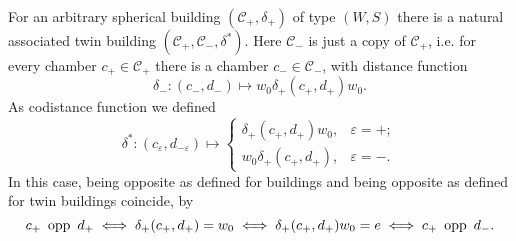 \begin{exam}
	For an arbitrary spherical building $(\mathcal{C}_+, \delta_+)$ of type $(W,S)$ there is a natural associated twin building $(\mathcal{C}_+, \mathcal{C}_-, \delta^*)$. Here $\mathcal{C}_-$ is just a copy of $\mathcal{C}_+$, i.e. for every chamber $c_+ \in \mathcal{C}_+$ there is a chamber $c_- \in \mathcal{C}_-$, with distance function
	$$ \delta_- : (c_-,d_-) \mapsto w_0 \delta_+(c_+,d_+) w_0. $$
	As codistance function we defined
	$$ \delta^* : (c_\varepsilon,d_{-\varepsilon}) \mapsto \begin{cases}
		\delta_+(c_+,d_+) w_0, & \varepsilon = +; \\
		w_0 \delta_+(c_+,d_+), & \varepsilon = -.
	\end{cases} $$
	In this case, being opposite as defined for buildings and being opposite as defined for twin buildings coincide, by
	$$ c_+ \opp d_+ \iff \delta_+(c_+,d_+) = w_0 \iff \delta_+(c_+,d_+) w_0 = e \iff c_+ \opp d_-. $$
\end{exam}
